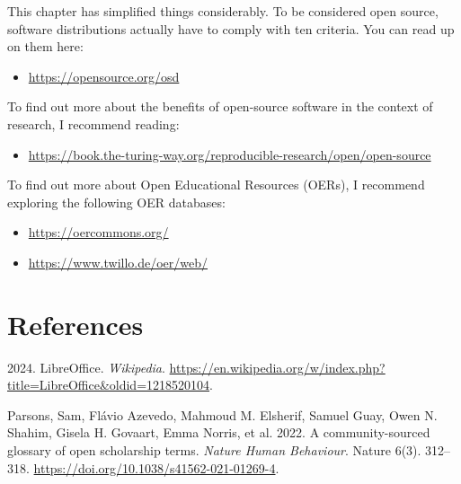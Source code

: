 \documentclass[
  letterpaper,
  DIV=11,
  numbers=noendperiod]{scrreprt}
\providecommand{\tightlist}{%
  \setlength{\itemsep}{0pt}\setlength{\parskip}{0pt}}\usepackage{longtable,booktabs,array}
\newlength{\cslhangindent}
\newenvironment{CSLReferences}[2] %
 {\begin{list}{}{%
  \setlength{\itemindent}{0pt}
  \setlength{\leftmargin}{0pt}
  \setlength{\parsep}{0pt}
  \ifodd #1
   \setlength{\leftmargin}{\cslhangindent}
   \setlength{\itemindent}{-1\cslhangindent}
  \fi
  \setlength{\itemsep}{#2\baselineskip}}}
 {\end{list}}
\begin{document}
\begin{tcolorbox}[enhanced jigsaw, colbacktitle=quarto-callout-note-color!10!white, rightrule=.15mm, breakable, toprule=.15mm, toptitle=1mm, colframe=quarto-callout-note-color-frame, bottomrule=.15mm, coltitle=black, opacityback=0, titlerule=0mm, opacitybacktitle=0.6, title=\textcolor{quarto-callout-note-color}{\faInfo}\hspace{0.5em}{Tips to go further}, left=2mm, arc=.35mm, leftrule=.75mm, bottomtitle=1mm, colback=white]

This chapter has simplified things considerably. To be considered open
source, software distributions actually have to comply with ten
criteria. You can read up on them here:

\begin{itemize}
\tightlist
\item
  \url{https://opensource.org/osd}
\end{itemize}

To find out more about the benefits of open-source software in the
context of research, I recommend reading:

\begin{itemize}
\tightlist
\item
  \url{https://book.the-turing-way.org/reproducible-research/open/open-source}
\end{itemize}

To find out more about Open Educational Resources (OERs), I recommend
exploring the following OER databases:

\begin{itemize}
\item
  \url{https://oercommons.org/}
\item
  \url{https://www.twillo.de/oer/web/}
\end{itemize}

\end{tcolorbox}


\chapter*{References}\label{references}


\label{refs}
\begin{CSLReferences}{1}{0}
2024. LibreOffice. \emph{Wikipedia}.
\url{https://en.wikipedia.org/w/index.php?title=LibreOffice&oldid=1218520104}.

Parsons, Sam, Flávio Azevedo, Mahmoud M. Elsherif, Samuel Guay, Owen N.
Shahim, Gisela H. Govaart, Emma Norris, et al. 2022. A community-sourced
glossary of open scholarship terms. \emph{Nature Human Behaviour}.
Nature 6(3). 312--318. \url{https://doi.org/10.1038/s41562-021-01269-4}.

\end{CSLReferences}
\end{document}
